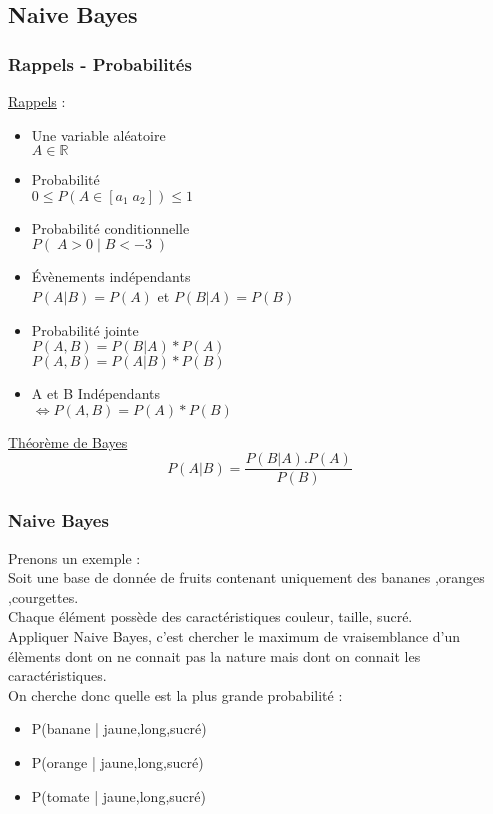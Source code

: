 \subsection{Naive Bayes}

\begin{frame}
  \frametitle{Rappels - Probabilités}
  \begin{minipage}[c]{0.60\linewidth}
    \underline{Rappels} :
    \begin{itemize}
    \item Une variable aléatoire \\ $A\in\mathbb{R}$
    \item Probabilité \\ $0 \leq P(A\in[a_1\;a_2]) \leq 1$
    \item Probabilité conditionnelle \\ $P(\;A>0\;|\;B<-3\;)$
    \item Évènements indépendants \\ $P(A|B)=P(A)$ et $P(B|A)=P(B)$
    \item Probabilité jointe \\ $P(A,B)=P(B|A)*P(A)$ \\ $P(A,B)=P(A|B)*P(B)$
    \item A et B Indépendants \\ $\iff P(A,B) = P(A)*P(B)$ 
    \end{itemize}
  \end{minipage}\hfill
  \begin{minipage}[c]{0.39\linewidth}
    \begin{center}
      \underline{Théorème de Bayes}
      \[
      \boxed{P(A|B)=\frac{P(B|A).P(A)}{P(B)}}
      \]
    \end{center}
  \end{minipage}\hfill
\end{frame}

\begin{frame}
  \frametitle{Naive Bayes}
  Prenons un exemple : \\
  Soit une base de donnée de fruits contenant uniquement des bananes ,oranges ,courgettes. \\
  Chaque élément possède des caractéristiques couleur, taille, sucré. \\
  Appliquer Naive Bayes, c'est chercher le maximum de vraisemblance d'un élèments dont on ne connait pas la nature mais dont on connait les caractéristiques. \\
  On cherche donc quelle est la plus grande probabilité :
  \begin{itemize}
  \item P(banane | jaune,long,sucré)
  \item P(orange | jaune,long,sucré)
  \item P(tomate | jaune,long,sucré)
  \end{itemize}
\end{frame}

